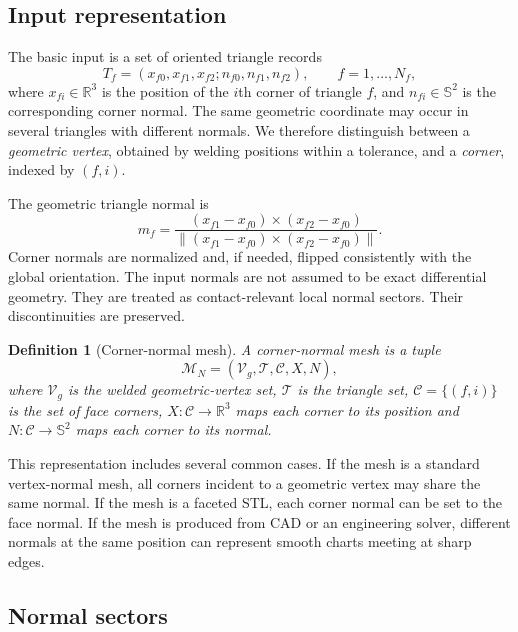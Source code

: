 \documentclass[preprint,12pt,sort&compress]{elsarticle}
\newtheorem{definition}{Definition}
\newcommand{\R}{\mathbb{R}}
\newcommand{\norm}[1]{\left\lVert #1 \right\rVert}
\newcommand{\cM}{\mathcal{M}}
\newcommand{\cC}{\mathcal{C}}
\newcommand{\cV}{\mathcal{V}}
\newcommand{\cT}{\mathcal{T}}
\begin{document}
\subsection{Input representation}

The basic input is a set of oriented triangle records
\begin{equation}
T_f = \left(x_{f0},x_{f1},x_{f2}; n_{f0},n_{f1},n_{f2}\right),
\qquad f=1,\ldots,N_f,
\label{eq:corner_record}
\end{equation}
where $x_{fi}\in\R^3$ is the position of the $i$th corner of triangle $f$, and $n_{fi}\in\mathbb{S}^2$ is the corresponding corner normal. The same geometric coordinate may occur in several triangles with different normals. We therefore distinguish between a \emph{geometric vertex}, obtained by welding positions within a tolerance, and a \emph{corner}, indexed by $(f,i)$.

The geometric triangle normal is
\begin{equation}
 m_f = \frac{(x_{f1}-x_{f0})\times (x_{f2}-x_{f0})}{\norm{(x_{f1}-x_{f0})\times (x_{f2}-x_{f0})}}.
\end{equation}
Corner normals are normalized and, if needed, flipped consistently with the global orientation. The input normals are not assumed to be exact differential geometry. They are treated as contact-relevant local normal sectors. Their discontinuities are preserved.

\begin{definition}[Corner-normal mesh]
A corner-normal mesh is a tuple
\begin{equation}
 \cM_N = (\cV_g,\cT,\cC, X, N),
\end{equation}
where $\cV_g$ is the welded geometric-vertex set, $\cT$ is the triangle set, $\cC=\{(f,i)\}$ is the set of face corners, $X:\cC\to\R^3$ maps each corner to its position and $N:\cC\to\mathbb{S}^2$ maps each corner to its normal.
\end{definition}

This representation includes several common cases. If the mesh is a standard vertex-normal mesh, all corners incident to a geometric vertex may share the same normal. If the mesh is a faceted STL, each corner normal can be set to the face normal. If the mesh is produced from CAD or an engineering solver, different normals at the same position can represent smooth charts meeting at sharp edges.

\subsection{Normal sectors}
\end{document}
